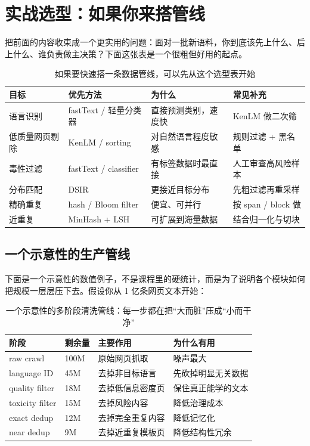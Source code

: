 \section{实战选型：如果你来搭管线}

把前面的内容收束成一个更实用的问题：面对一批新语料，你到底该先上什么、后上什么、谁负责做主决策？下面这张表是一个很粗但好用的起点。

\begin{table}[H]
\centering
\small
\renewcommand{\arraystretch}{1.2}
\begin{tabular}{p{2.7cm}p{4.0cm}p{4.0cm}p{3.2cm}}
\toprule
\textbf{目标} & \textbf{优先方法} & \textbf{为什么} & \textbf{常见补充} \\
\midrule
语言识别 & fastText / 轻量分类器 & 直接预测类别，速度快 & KenLM 做二次筛 \\
低质量网页剔除 & KenLM / sorting & 对自然语言程度敏感 & 规则过滤 + 黑名单 \\
毒性过滤 & fastText / classifier & 有标签数据时最直接 & 人工审查高风险样本 \\
分布匹配 & DSIR & 更接近目标分布 & 先粗过滤再重采样 \\
精确重复 & hash / Bloom filter & 便宜、可并行 & 按 span / block 做 \\
近重复 & MinHash + LSH & 可扩展到海量数据 & 结合归一化与切块 \\
\bottomrule
\end{tabular}
\caption{如果要快速搭一条数据管线，可以先从这个选型表开始}
\end{table}

\subsection{一个示意性的生产管线}

下面是一个示意性的数值例子，不是课程里的硬统计，而是为了说明各个模块如何把规模一层层压下去。假设你从 1 亿条网页文本开始：

\begin{table}[H]
\centering
\small
\renewcommand{\arraystretch}{1.15}
\begin{tabular}{p{3.0cm}p{2.8cm}p{4.5cm}p{2.7cm}}
\toprule
\textbf{阶段} & \textbf{剩余量} & \textbf{主要作用} & \textbf{为什么有用} \\
\midrule
raw crawl & 100M & 原始网页抓取 & 噪声最大 \\
language ID & 45M & 去掉非目标语言 & 先砍掉明显无关数据 \\
quality filter & 18M & 去掉低信息密度页 & 保住真正能学的文本 \\
toxicity filter & 15M & 去掉风险内容 & 降低治理成本 \\
exact dedup & 12M & 去掉完全重复内容 & 降低记忆化 \\
near dedup & 9M & 去掉近重复模板页 & 降低结构性冗余 \\
\bottomrule
\end{tabular}
\caption{一个示意性的多阶段清洗管线：每一步都在把“大而脏”压成“小而干净”}
\end{table}

